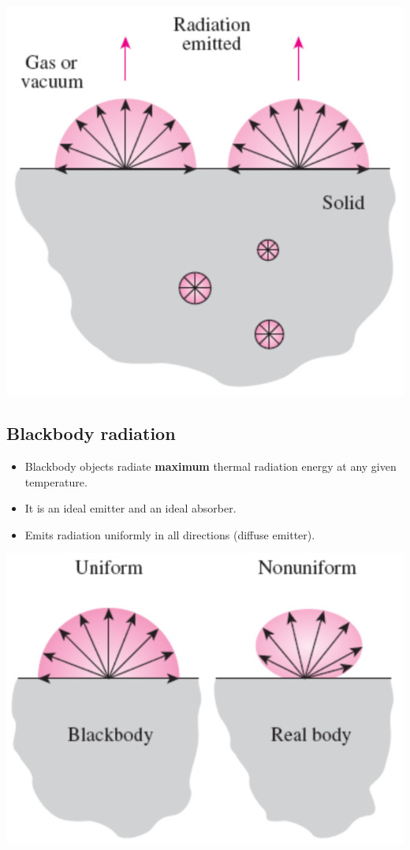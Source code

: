 \documentclass[11pt]{article}
\begin{document}
\begin{center}
\includegraphics[width=.9\linewidth]{./images/thermal-radiation-diagram.png}
\end{center}

 \newpage

\subsection{Blackbody radiation}
\label{sec:org04c8842}
\begin{itemize}
\item Blackbody objects radiate \textbf{maximum} thermal radiation energy at any given temperature.
\item It is an ideal emitter and an ideal absorber.
\item Emits radiation uniformly in all directions (diffuse emitter).
\end{itemize}

\begin{center}
\includegraphics[width=.9\linewidth]{./images/blackbody-radiation-diagram.png}
\end{center}
\end{document}

